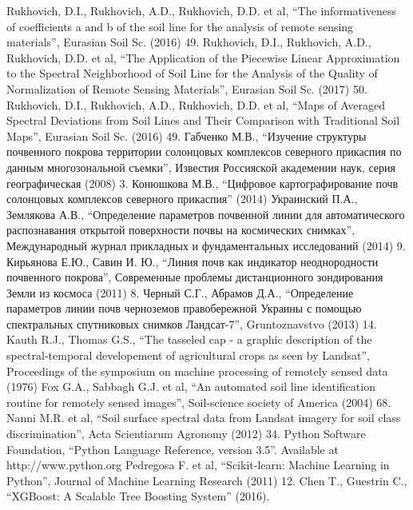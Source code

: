 \documentclass[14pt]{extarticle}
\begin{document}
\begin{thebibliography}{9}
        Rukhovich, D.I., Rukhovich, A.D., Rukhovich, D.D. et al, 
        ``The informativeness of coefficients a and b of the 
        soil line for the analysis of remote sensing materials'',
        Eurasian Soil Sc. (2016) 49.
        Rukhovich, D.I., Rukhovich, A.D., Rukhovich, D.D. et al, 
        ``The Application of the Piecewise Linear Approximation
        to the Spectral Neighborhood of Soil Line for the Analysis
        of the Quality of Normalization of Remote Sensing Materials'',
        Eurasian Soil Sc. (2017) 50.
        Rukhovich, D.I., Rukhovich, A.D., Rukhovich, D.D. et al, 
        ``Maps of Averaged Spectral Deviations from Soil Lines
        and Their Comparison with Traditional Soil Maps'',
        Eurasian Soil Sc. (2016) 49.
        Габченко М.В., ``Изучение структуры почвенного покрова территории солонцовых
        комплексов северного прикаспия по данным многозональной съемки'', 
        Известия Россияской академении наук, серия географическая (2008) 3.
        Конюшкова М.В., ``Цифровое картографирование почв солонцовых комплексов
        северного прикаспия'' (2014)
        Украинский П.А., Землякова А.В., ``Определение параметров почвенной линии
        для автоматического распознавания открытой поверхности почвы на космических
        снимках'', Международный журнал прикладных и фундаментальных исследований
        (2014) 9.
        Кирьянова Е.Ю., Савин И. Ю., ``Линия почв как индикатор неоднородности
        почвенного покрова'', Современные проблемы дистанционного зондирования
        Земли из космоса (2011) 8.
        Черный С.Г., Абрамов Д.А., ``Определение параметров линии почв черноземов
        правобережной Украины с помощью спектральных спутниковых снимков Ландсат-7'',
        Gruntoznavstvo (2013) 14.
        Kauth R.J., Thomas G.S., ``The tasseled cap - a graphic description of the
        spectral-temporal developement of agricultural crops as seen by Landsat'',
        Proceedings of the symposium on machine processing of remotely sensed data (1976)
        Fox G.A., Sabbagh G.J. et al, ``An automated soil line identification routine
        for remotely sensed images'', Soil-science society of America (2004) 68.
        Nanni M.R. et al, ``Soil surface spectral data from Landsat imagery for soil class
        discrimination'', Acta Scientiarum Agronomy (2012) 34.
        Python Software Foundation, ``Python Language Reference, 
        version 3.5''. Available at http://www.python.org
        Pedregosa F. et al, ``Scikit-learn: Machine Learning in Python'',
        Journal of Machine Learning Research (2011) 12.
        Chen T., Guestrin C., ``XGBoost: A Scalable Tree Boosting System'' (2016).
\end{thebibliography}
\end{document}
